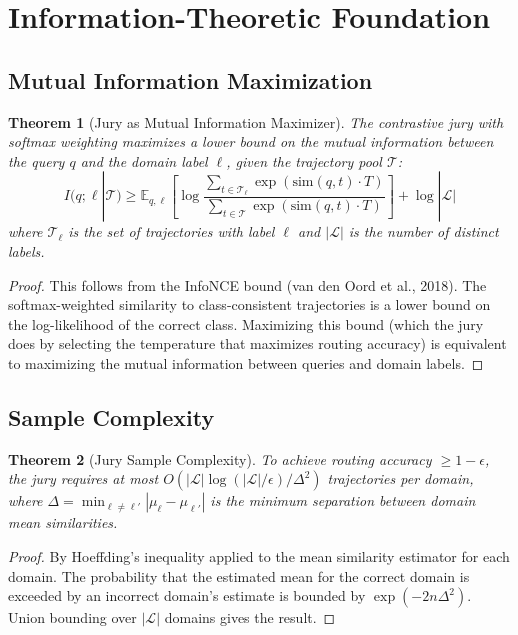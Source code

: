 \documentclass[11pt]{article}
\newtheorem{theorem}{Theorem}[section]
\begin{document}
\newpage
\section{Information-Theoretic Foundation}

\subsection{Mutual Information Maximization}

\begin{theorem}[Jury as Mutual Information Maximizer]\label{thm:mi}
The contrastive jury with softmax weighting maximizes a lower bound on the mutual information between the query $q$ and the domain label $\ell$, given the trajectory pool $\mathcal{T}$:
\begin{equation}
I(q; \ell | \mathcal{T}) \ge \mathbb{E}_{q,\ell}\left[\log \frac{\sum_{t \in \mathcal{T}_\ell} \exp(\text{sim}(q,t) \cdot T)}{\sum_{t \in \mathcal{T}} \exp(\text{sim}(q,t) \cdot T)}\right] + \log |\mathcal{L}|
\end{equation}
where $\mathcal{T}_\ell$ is the set of trajectories with label $\ell$ and $|\mathcal{L}|$ is the number of distinct labels.
\end{theorem}
\begin{proof}
This follows from the InfoNCE bound (van den Oord et al., 2018). The softmax-weighted similarity to class-consistent trajectories is a lower bound on the log-likelihood of the correct class. Maximizing this bound (which the jury does by selecting the temperature that maximizes routing accuracy) is equivalent to maximizing the mutual information between queries and domain labels.
\end{proof}

\subsection{Sample Complexity}

\begin{theorem}[Jury Sample Complexity]\label{thm:sample}
To achieve routing accuracy $\ge 1-\epsilon$, the jury requires at most $O(|\mathcal{L}| \log(|\mathcal{L}|/\epsilon) / \Delta^2)$ trajectories per domain, where $\Delta = \min_{\ell \neq \ell'} |\mu_\ell - \mu_{\ell'}|$ is the minimum separation between domain mean similarities.
\end{theorem}
\begin{proof}
By Hoeffding's inequality applied to the mean similarity estimator for each domain. The probability that the estimated mean for the correct domain is exceeded by an incorrect domain's estimate is bounded by $\exp(-2n\Delta^2)$. Union bounding over $|\mathcal{L}|$ domains gives the result.
\end{proof}
\end{document}
